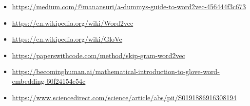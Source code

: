 \documentclass[12pt,letterpaper]{article}
\begin{document}
\begin{itemize}
    \item \href{https://medium.com/@manansuri/a-dummys-guide-to-word2vec-456444f3c673}{https://medium.com/@manansuri/a-dummys-guide-to-word2vec-456444f3c673}
    \item \href{https://en.wikipedia.org/wiki/Word2vec}{https://en.wikipedia.org/wiki/Word2vec}
    \item \href{https://en.wikipedia.org/wiki/GloVe}{https://en.wikipedia.org/wiki/GloVe}
    \item \href{https://paperswithcode.com/method/skip-gram-word2vec}{https://paperswithcode.com/method/skip-gram-word2vec}
    \item \href{https://becominghuman.ai/mathematical-introduction-to-glove-word-embedding-60f24154e54c}{https://becominghuman.ai/mathematical-introduction-to-glove-word-embedding-60f24154e54c}

    \item \href{https://www.sciencedirect.com/science/article/abs/pii/S0191886916308194}{https://www.sciencedirect.com/science/article/abs/pii/S0191886916308194}
    
    
\end{itemize}
\end{document}
